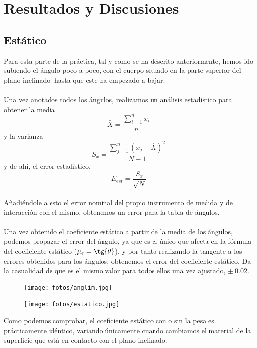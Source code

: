 \documentclass{article}
\begin{document}
\clearpage
\section{Resultados y Discusiones}
    \subsection{Estático}
    Para esta parte de la práctica, tal y como se ha descrito anteriormente, hemos ido subiendo el ángulo poco a poco, con el cuerpo situado en la parte superior del plano inclinado, hasta que este ha empezado a bajar. \\\\Una vez anotados todos los ángulos, realizamos un análisis estadístico para obtener la media 
    \[\bar{X} = \frac{\sum_{i = 1}^n x_i}{n}\] 
    y la varianza
    \[ S_x = \frac{\sum_{j=1}^{n} \left( x_j - \bar{X}\right)^2}{N-1}\]
    y de ahí, el error estadístico.
    \[ E_{est} = \frac{S_x}{\sqrt{N}}\]\\
    
    Añadiéndole a esto el error nominal del propio instrumento de medida y de interacción con el mismo, obtenemos un error para la tabla de ángulos.\\\\ Una vez obtenido el coeficiente estático a partir de la media de los ángulos, podemos propagar el error del ángulo, ya que es el único que afecta en la fórmula del coeficiente estático ($\mu_e = \tg{\theta}$), y por tanto realizando la tangente a los errores obtenidos para los ángulos, obtenemos el error del coeficiente estático. Da la casualidad de que es el mismo valor para todos ellos una vez ajustado, $\pm \ 0.02.$
    
        \begin{figure}[h]
        \centering
        \texttt{[image: fotos/anglim.jpg]}
        \end{figure}
        
        \begin{figure}[h]
        \centering
        \texttt{[image: fotos/estatico.jpg]}
        \end{figure}
    
    Como podemos comprobar, el coeficiente estático con o sin la pesa es prácticamente idéntico, variando únicamente cuando cambiamos el material de la superficie que está en contacto con el plano inclinado.
    
    \clearpage
\end{document}
